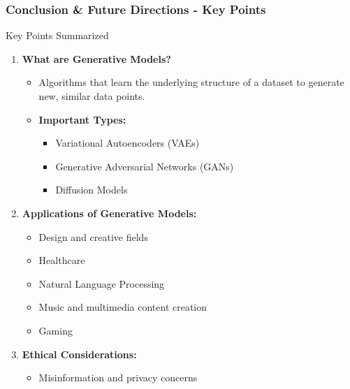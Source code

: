 \documentclass[aspectratio=169]{beamer}
\begin{document}
\begin{frame}[fragile]
  \frametitle{Conclusion \& Future Directions - Key Points}
  \begin{block}{Key Points Summarized}
    \begin{enumerate}
      \item \textbf{What are Generative Models?}
        \begin{itemize}
          \item Algorithms that learn the underlying structure of a dataset to generate new, similar data points.
          \item \textbf{Important Types:}
            \begin{itemize}
              \item Variational Autoencoders (VAEs)
              \item Generative Adversarial Networks (GANs)
              \item Diffusion Models
            \end{itemize}
        \end{itemize}
      \item \textbf{Applications of Generative Models:}
        \begin{itemize}
          \item Design and creative fields
          \item Healthcare
          \item Natural Language Processing
          \item Music and multimedia content creation
          \item Gaming
        \end{itemize}
      \item \textbf{Ethical Considerations:}
        \begin{itemize}
          \item Misinformation and privacy concerns
        \end{itemize}
    \end{enumerate}
  \end{block}
\end{frame}
\end{document}
